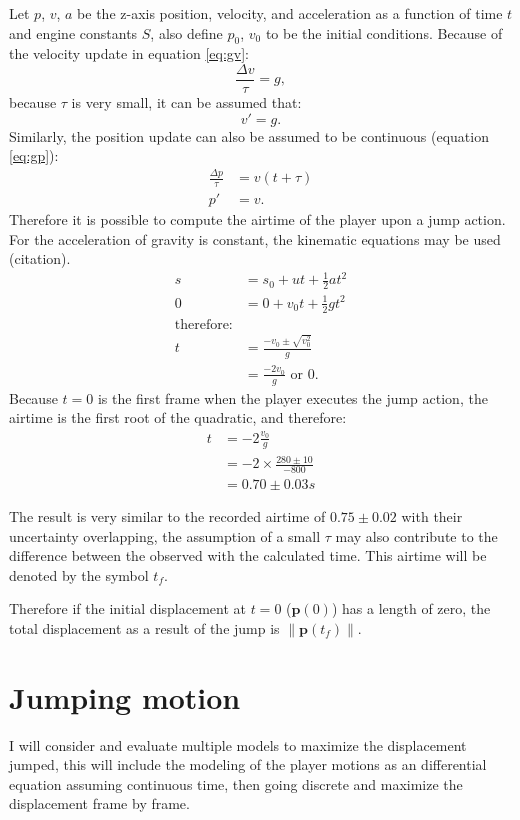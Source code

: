 \documentclass[a4paper,11pt]{article}
\newcommand{\tvec}[1]{\boldsymbol{#1}}
\newcommand{\tmag}[1]{\|#1\|}
\newcommand{\tp}{\tvec{p}}
\begin{document}
Let $p$, $v$, $a$ be the z-axis position, velocity, and acceleration as a function of time $t$ and engine constants $S$, also define $p_0$, $v_0$ to be the initial conditions. Because of the velocity update in equation \ref{eq:gv}:
\[
    \frac{\Delta v}{\tau} = g,
\]
because $\tau$ is very small, it can be assumed that:
\[
    v' = g.
\]
Similarly, the position update can also be assumed to be continuous (equation \ref{eq:gp}):
\begin{align*}
 \frac{\Delta p}{\tau} &= v(t+\tau)\\
 p' &= v.
\end{align*}
Therefore it is possible to compute the airtime of the player upon a jump action. For the acceleration of gravity is constant, the kinematic equations may be used (citation).
\begin{align*}
    s &= s_0 + ut + \frac{1}{2} a t^2\\
    0 &= 0 + v_0 t + \frac{1}{2} g t^2\\
    \text{therefore:}&\\
    t &= \frac{-v_0 \pm \sqrt{v_0^2}}{g}\\
    &= \frac{-2v_0}{g} \,\, \text{or} \,\, 0.
\end{align*}
Because $t=0$ is the first frame when the player executes the jump action, the airtime is the first root of the quadratic, and therefore:
\begin{align*}
    t &= -2 \frac{v_0}{g}\\
    &= -2 \times \frac{280\pm 10}{-800}\\
    &= 0.70 \pm 0.03 \si{s}
\end{align*}

The result is very similar to the recorded airtime of $0.75\pm 0.02$ with their uncertainty overlapping, the assumption of a small $\tau$ may also contribute to the difference between the observed with the calculated time. This airtime will be denoted by the symbol $t_f$.

Therefore if the initial displacement at $t=0$ ($\tp(0)$) has a length of zero, the total displacement as a result of the jump is $\tmag{\tp(t_f)}$.

\section{Jumping motion}
I will consider and evaluate multiple models to maximize the displacement jumped, this will include the modeling of the player motions as an differential equation assuming continuous time, then going discrete and maximize the displacement frame by frame.
\end{document}

